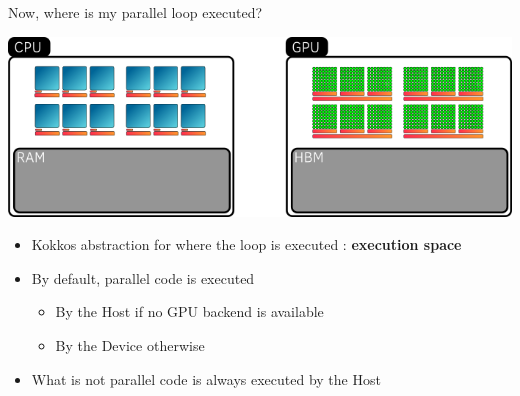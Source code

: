 \documentclass[aspectratio=169]{beamer}
\newcommand{\highlight}[1]{\textcolor{main}{\textbf{#1}}}
\begin{document}

\begin{frame}{Now, where is my parallel loop executed?}
    \begin{center}
        \includegraphics[width=0.8\linewidth]{execution_space.png}
    \end{center}
    \begin{itemize}
        \item Kokkos abstraction for where the loop is executed : \highlight{execution space}
        \item By default, parallel code is executed
        \begin{itemize}
            \item By the Host if no GPU backend is available
            \item By the Device otherwise
        \end{itemize}
        \item What is not parallel code is always executed by the Host
    \end{itemize}
\end{frame}

\end{document}
